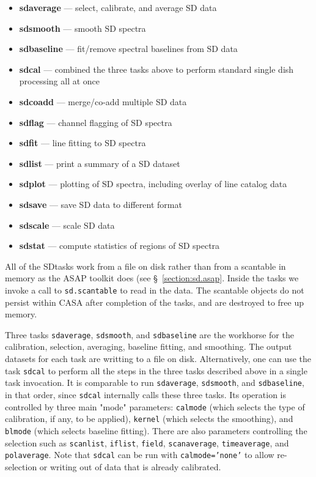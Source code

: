 \begin{itemize}

\item {\bf sdaverage} --- select, calibrate, and average SD data

\item {\bf sdsmooth} --- smooth SD spectra

\item {\bf sdbaseline} --- fit/remove spectral baselines from SD data

\item {\bf sdcal} --- combined the three tasks above to perform standard single dish processing all at once 

\item {\bf sdcoadd} --- merge/co-add multiple SD data

\item {\bf sdflag} --- channel flagging of SD spectra

\item {\bf sdfit} --- line fitting to SD spectra

\item {\bf sdlist} --- print a summary of a SD dataset

\item {\bf sdplot} --- plotting of SD spectra, including overlay of line
catalog data

\item {\bf sdsave} --- save SD data to different format

\item {\bf sdscale} --- scale SD data
 
\item {\bf sdstat} --- compute statistics of regions of SD spectra

\end{itemize}

All of the SDtasks work from a file on disk rather than from
a scantable in memory as the ASAP toolkit does (see 
\S~\ref{section:sd.asap}.  Inside the tasks we invoke a call
to {\tt sd.scantable} to read in the data.  The scantable objects
do not persist within CASA after completion of the tasks, and
are destroyed to free up memory.

Three tasks {\tt sdaverage}, {\tt sdsmooth}, and {\tt sdbaseline} are the
workhorse for the calibration, selection,
averaging, baseline fitting, and smoothing. The output datasets for
each task are writting to a file on disk.
Alternatively, one can use the task {\tt sdcal} to perform all the steps in
the three tasks described above in a single task invocation. It is comparable 
to run {\tt sdaverage}, {\tt sdsmooth}, and {\tt sdbaseline}, in that order, since
{\tt sdcal} internally calls these three tasks. 
Its operation is
controlled by three main "mode" parameters: {\tt calmode} (which selects
the type of calibration, if any, to be applied), {\tt kernel} (which selects
the smoothing), and {\tt blmode} (which selects baseline fitting).  There
are also parameters controlling the selection such as {\tt scanlist}, 
{\tt iflist}, {\tt field}, {\tt scanaverage}, {\tt timeaverage}, and
{\tt polaverage}.  Note that {\tt sdcal} can be
run with {\tt calmode='none'} to allow re-selection or writing out of data
that is already calibrated.

